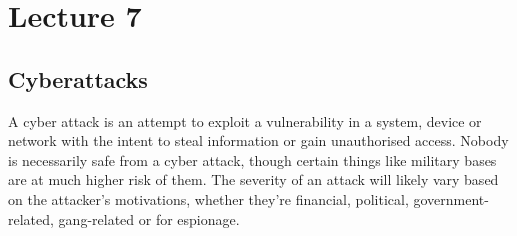 \documentclass[12pt]{report}
\begin{document}
\tableofcontents

\addtocounter{chapter}{6}

\chapter{Lecture 7}
\section{Cyberattacks}
A cyber attack is an attempt to exploit a vulnerability in a system, device or network with the intent to steal information or gain unauthorised access.
Nobody is necessarily safe from a cyber attack, though certain things like military bases are at much higher risk of them.
The severity of an attack will likely vary based on the attacker's motivations, whether they're financial, political, government-related, gang-related or
for espionage.
\end{document}
